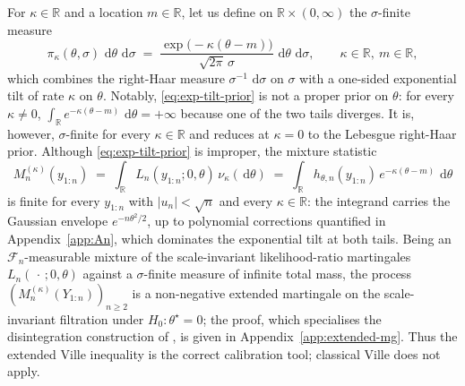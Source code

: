 \documentclass[numsec,webpdf,modern,medium,namedate]{oup-authoring-template}
\theoremstyle{thmstyleone}%
\theoremstyle{thmstyletwo}%
\theoremstyle{thmstylethree}%
\newcommand{\dd}{\,\mathrm{d}}
\newcommand{\1}{\mathbf{1}}
\begin{document}
For $\kappa\in\mathbb{R}$ and a location $m\in\mathbb{R}$, let us define on $\mathbb{R}\times(0,\infty)$ the $\sigma$-finite measure
\begin{equation}\label{eq:exp-tilt-prior}
  \pi_\kappa(\theta,\sigma)\,\dd\theta\,\dd\sigma
  \;=\;\frac{\exp\!\bigl(-\kappa(\theta-m)\bigr)}{\sqrt{2\pi}\,\sigma}\,
  \dd\theta\,\dd\sigma,
  \qquad \kappa\in\mathbb{R},\ m\in\mathbb{R},
\end{equation}
which combines the right-Haar measure $\sigma^{-1}\,\dd\sigma$ on $\sigma$
with a one-sided exponential tilt of rate $\kappa$ on $\theta$. Notably, \eqref{eq:exp-tilt-prior} is not a proper prior on $\theta$: for every $\kappa\neq 0$, $\int_\mathbb{R} e^{-\kappa(\theta-m)}\,
\dd\theta=+\infty$ because one of the two tails diverges. It is, however, $\sigma$-finite for every $\kappa\in\mathbb{R}$ and reduces at $\kappa=0$ to the
Lebesgue right-Haar prior. Although \eqref{eq:exp-tilt-prior} is improper, the mixture statistic
\begin{equation}\label{eq:Mkappa-def}
  M_n^{(\kappa)}(y_{1:n})
  \;=\;\int_\mathbb{R} L_n(y_{1:n};0,\theta)\,\nu_\kappa(\dd\theta)
  \;=\;\int_\mathbb{R} h_{\theta,n}(y_{1:n})\,e^{-\kappa(\theta-m)}\,\dd\theta
\end{equation}
is finite for every $y_{1:n}$ with $|u_n|<\sqrt n$ and every $\kappa\in\mathbb{R}$: the integrand carries the Gaussian envelope $e^{-n\theta^2/2}$, up to polynomial corrections quantified in Appendix~\ref{app:An}, which dominates the exponential tilt at both tails. Being an $\mathcal{F}_n$-measurable mixture of the scale-invariant likelihood-ratio martingales $L_n(\,\cdot\,;0,\theta)$ against a $\sigma$-finite measure of infinite total mass, the process $(M_n^{(\kappa)}(Y_{1:n}))_{n\geq 2}$ is a non-negative extended martingale on the scale-invariant filtration under $H_0:\theta^\star=0$; the proof, which specialises the disintegration construction of \cite[Lemma~5.4]{Wang2025}, is given in Appendix~\ref{app:extended-mg}. Thus the extended Ville inequality is the correct calibration tool; classical Ville does not apply.
\end{document}
